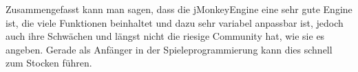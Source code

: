 Zusammengefasst kann man sagen, dass die jMonkeyEngine eine sehr gute Engine ist, die viele Funktionen beinhaltet und dazu sehr variabel anpassbar ist, jedoch auch ihre Schwächen und längst nicht die riesige Community hat, wie sie es angeben. Gerade als Anfänger in der Spieleprogrammierung kann dies schnell zum Stocken führen.

